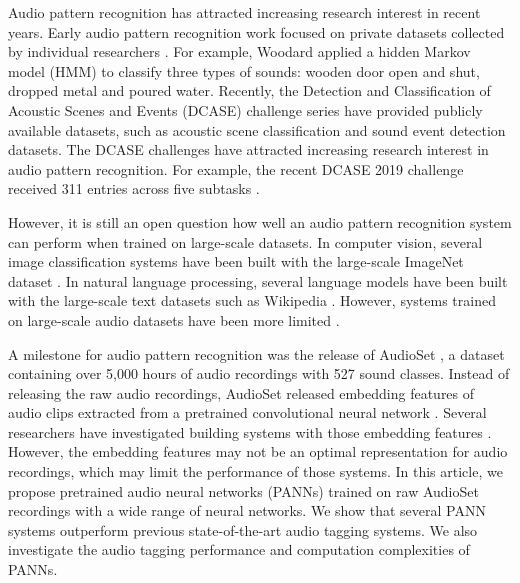 \documentclass[journal]{IEEEtran}
\begin{document}
Audio pattern recognition has attracted increasing research interest in recent years. Early audio pattern recognition work focused on private datasets collected by individual researchers \cite{woodard1992modeling}\cite{ellis2001detecting}. For example, Woodard \cite{woodard1992modeling} applied a hidden Markov model (HMM) to classify three types of sounds: wooden door open and shut, dropped metal and poured water. Recently, the Detection and Classification of Acoustic Scenes and Events (DCASE) challenge series \cite{stowell2015detection}\cite{mesaros2018detection}\cite{mesaros2017dcase}\cite{mesaros2018multi} have provided publicly available datasets, such as acoustic scene classification and sound event detection datasets. The DCASE challenges have attracted increasing research interest in audio pattern recognition. For example, the recent DCASE 2019 challenge received 311 entries across five subtasks \cite{dcase2019_challenge}.

However, it is still an open question how well an audio pattern recognition system can perform when trained on large-scale datasets. In computer vision, several image classification systems have been built with the large-scale ImageNet dataset \cite{deng2009imagenet}. In natural language processing, several language models have been built with the large-scale text datasets such as Wikipedia \cite{devlin2018bert}. However, systems trained on large-scale audio datasets have been more limited \cite{gemmeke2017audio}\cite{hershey2017cnn}\cite{choi2017transfer}\cite{pons2017end}.

A milestone for audio pattern recognition was the release of AudioSet \cite{gemmeke2017audio}, a dataset containing over 5,000 hours of audio recordings with 527 sound classes. Instead of releasing the raw audio recordings, AudioSet released embedding features of audio clips extracted from a pretrained convolutional neural network \cite{hershey2017cnn}. Several researchers have investigated building systems with those embedding features \cite{hershey2017cnn}\cite{kong2018audio}\cite{yu2018multi}\cite{chou2018learning}\cite{wang2019comparison}\cite{kong2019weakly}. However, the embedding features may not be an optimal representation for audio recordings, which may limit the performance of those systems. In this article, we propose pretrained audio neural networks (PANNs) trained on raw AudioSet recordings with a wide range of neural networks. We show that several PANN systems outperform previous state-of-the-art audio tagging systems. We also investigate the audio tagging performance and computation complexities of PANNs. 
\end{document}
